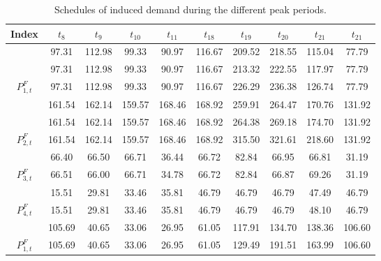 \documentclass[journal]{IEEEtran}
\begin{document}
\begin{table}[!bt]
	\centering
	\renewcommand{\arraystretch}{1.3}
	\setlength\tabcolsep{1.4pt}
	\caption{Schedules of induced demand during the different peak periods.}
	\label{tab: Ch6_optimal demand schedule 108}
	\begin{tabular}{cccccccccc}
		\hline
		Index              & $t_8$                            & $t_9$                            & $t_{10}$                           & $t_{11}$                           & $t_{18}$                           & $t_{19}$                           & $t_{20}$                           & $t_{21}$                           & $t_{21}$                           \\ \hline
		    & 97.31  & 112.98 & 99.33  & 90.97  & 116.67 & 209.52 & 218.55 & 115.04 & 77.79  \\
		& 97.31  & 112.98 & 99.33  & 90.97  & 116.67 & 213.32 & 222.55 & 117.97 & 77.79  \\
		\multirow{-3}{*}{$P_{1,t}^{F}$} & 97.31  & 112.98 & 99.33  & 90.97  & 116.67 & 226.29 & 236.38 & 126.74 & 77.79  \\ \hline
		& 161.54 & 162.14 & 159.57 & 168.46 & 168.92 & 259.91 & 264.47 & 170.76 & 131.92 \\
		& 161.54 & 162.14 & 159.57 & 168.46 & 168.92 & 264.38 & 269.18 & 174.70 & 131.92 \\
		\multirow{-3}{*}{$P_{2,t}^{F}$}  & 161.54 & 162.14 & 159.57 & 168.46 & 168.92 & 315.50 & 321.61 & 218.60 & 131.92 \\ \hline
		& 66.40  & 66.50  & 66.71  & 36.44  & 66.72  & 82.84  & 66.95  & 66.81  & 31.19  \\
		\multirow{-2}{*}{$P_{3,t}^{F}$}  & 66.51  & 66.00  & 66.71  & 34.78  & 66.72  & 82.84  & 66.87  & 69.26  & 31.19  \\ \hline
		& 15.51  & 29.81  & 33.46  & 35.81  & 46.79  & 46.79  & 46.79  & 47.49  & 46.79  \\
		\multirow{-2}{*}{$P_{4,t}^{F}$}  & 15.51  & 29.81  & 33.46  & 35.81  & 46.79  & 46.79  & 46.79  & 48.10  & 46.79  \\ \hline
		& 105.69 & 40.65  & 33.06  & 26.95  & 61.05  & 117.91 & 134.70 & 138.36 & 106.60 \\
		\multirow{-2}{*}{$P_{1,t}^{F}$}  & 105.69 & 40.65  & 33.06  & 26.95  & 61.05  & 129.49 & 191.51 & 163.99 & 106.60 \\ \hline
	\end{tabular}
\vspace{-2mm}
\end{table}
\end{document}
